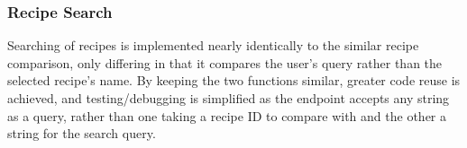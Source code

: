 \begin{table}[p]
    \centering
    \caption{\label{tab:similar}Similar recipes for \enquote*{Spaghetti} and \enquote*{Apple Crumble}. Most results are omitted for brevity.}
    \quad
\end{table}

\subsubsection{Recipe Search}

Searching of recipes is implemented nearly identically to the similar recipe comparison, only differing in that
it compares the user's query rather than the selected recipe's name. By keeping the two functions similar, greater
code reuse is achieved, and testing/debugging is simplified as the endpoint accepts any string as a query, rather
than one taking a recipe ID to compare with and the other a string for the search query.

